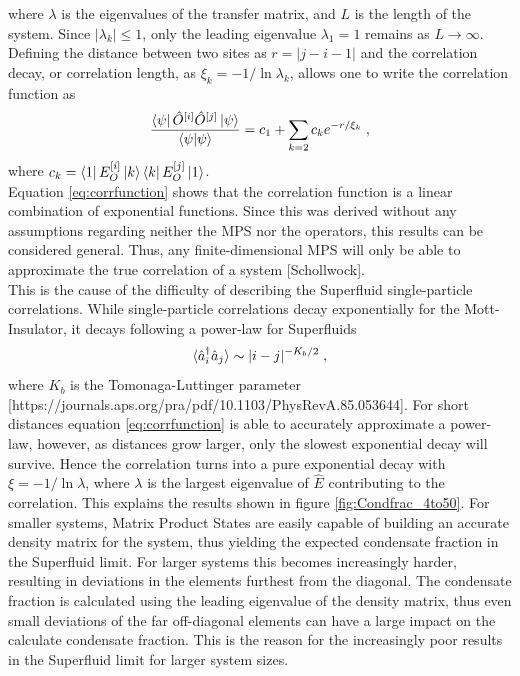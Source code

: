 where $\lambda$ is the eigenvalues of the transfer matrix, and $L$ is the length of the system. Since $|\lambda_k| \leq 1 $, only the leading eigenvalue $\lambda_1 = 1$ remains as $L \to \infty$. Defining the distance between two sites as $r = |j - i -1|$ and the correlation decay, or correlation length, as $\xi_k = -1/\ln \lambda_k$, allows one to write the correlation function as
\begin{equation}
	\frac{\bra{\psi} \hat{O}^{[i]} \hat{O}^{[j]} \ket{\psi}}{\braket{\psi | \psi}} = c_1 + \sum_{k = 2} c_k e^{-r/ \xi_k} \; , \label{eq:corrfunction}
\end{equation}
where $c_k = \bra{1} E_{O}^{[i]} \ket{k} \bra{k} E_{O}^{[j]} \ket{1}$.\\
Equation \ref{eq:corrfunction} shows that the correlation function is a linear combination of exponential functions. Since this was derived without any assumptions regarding neither the MPS nor the operators, this results can be considered general. Thus, any finite-dimensional MPS will only be able to approximate the true correlation of a system [Schollwock].\\
This is the cause of the difficulty of describing the Superfluid single-particle correlations. While single-particle correlations decay exponentially for the Mott-Insulator, it decays following a power-law for Superfluids
\begin{equation}
	\braket{\hat{a}_{i}^{\dag} \hat{a}_{j}} \sim |i - j|^{-K_b /2} \; ,
\end{equation}
where $K_b$ is the Tomonaga-Luttinger parameter [https://journals.aps.org/pra/pdf/10.1103/PhysRevA.85.053644]. For short distances equation \ref{eq:corrfunction} is able to accurately approximate a power-law, however, as distances grow larger, only the slowest exponential decay will survive. Hence the correlation turns into a pure exponential decay with $\xi = -1/ \ln \lambda$, where $\lambda$ is the largest eigenvalue of $\hat{E}$ contributing to the correlation. This explains the results shown in figure \ref{fig:Condfrac_4to50}. For smaller systems, Matrix Product States are easily capable of building an accurate density matrix for the system, thus yielding the expected condensate fraction in the Superfluid limit. For larger systems this becomes increasingly harder, resulting in deviations in the elements furthest from the diagonal. The condensate fraction is calculated using the leading eigenvalue of the density matrix, thus even small deviations of the far off-diagonal elements can have a large impact on the calculate condensate fraction. This is the reason for the increasingly poor results in the Superfluid limit for larger system sizes.\\

